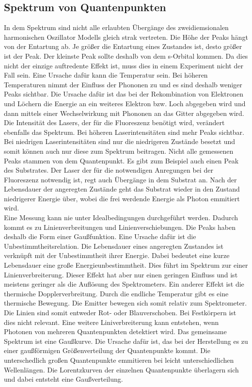 \subsection{Spektrum von Quantenpunkten}
In dem Spektrum sind nicht alle erlaubten Übergänge des zweidiemsionalen harmonischen Oszillator Modells gleich strak vertreten. Die Höhe der Peaks hängt von der Entartung ab. Je grö{\ss}er die Entartung eines Zustandes ist, desto grö{\ss}er ist der Peak. Der kleinste Peak sollte deshalb von dem s-Orbital kommen. Da dies nicht der einzige auftredente Effekt ist, muss dies in einem Experiment nicht der Fall sein. Eine Ursache dafür kann die Temperatur sein. Bei höheren Temperaturen nimmt der Einfluss der Phononen zu und es sind deshalb weniger Peaks sichtbar. 
Die Ursache dafür ist das bei der Rekombination von Elektronen und Löchern die Energie an ein weiteres Elektron bzw. Loch abgegeben wird und dann mittels einer Wechselwirkung mit Phononen an das Gitter abgegeben wird.
Die Intensität des Lasers, der für die Fluoreszenz benötigt wird, verändert ebenfalls das Spektrum. Bei höheren Laserintensitäten sind mehr Peaks sichtbar. 
Bei niedrigen Laserintensitäten sind nur die niedrigeren Zustände besetzt und somit können auch nur diese zum Spektrum beitragen.
Nicht alle gemessenen Peaks stammen von dem Quantenpunkt. Es gibt zum Beispiel auch einen Peak des Substrates.
Der Laser der für die notwendigen Anregungen bei der Fluoreszenz notwendig ist, regt auch Übergänge in dem Substrat an. Nach der Lebensdauer der angeregten Zustände geht das Substrat wieder in den Zustand niedrigerer Energie über, wobei die frei werdende Energie als Photon emmitiert wird. \\
Eine Messung kann nie unter Idealbedingungen durchgeführt werden. Dadurch kommt es zu Linienverbreitungen und Linienverschiebungen. Die Peaks haben deshalb die Form einer Gau{\ss}funktion. Eine Ursache dafür ist die Unbestimmtheitsrelation. Die Lebensdauer eines angeregten Zustandes ist verknüpft mit der Unbestimmtheit ihrer Energie.  Dabei bedeutet eine kurze Lebensdauer eine gro{\ss}e Energieunbestimmtheit. Dies führt im Spektrum zur einer Linienverbreiterung.
Dieser Effekt hat aber nur einen geringen Einfluss und ist meistens geringer als die Auflösung des Spektrometers. 
Ein anderer Effekt ist die thermische Dopplerverbreitung. Durch die endliche Temperatur gibt es eine thermische Bewegung. Die Emitter bewegen sich somit relativ zum Spektrometer. Die Linien sind somit entweder Rot- oder Blauverschoben.
Bei Festkörpern ist dies nicht relevant. 
Eine weitere Liniverbreiterung kann entstehen, wenn Photonen von mehreren Quantenpunkten detektiert wird. Das gemeinsame Spektrum ist eine Gaußkurve. Die Ursache dafür ist, das bei der Herstellung es zu einer gaußförmigen Größenverteilung der Quantenpunkte kommt. Die unterschedlich großen Quantenpunkte emmitieren bei leicht unterschiedlichen Wellenlängen. 
Die Lorentzkurven der einzelnen Quantenpunkte überlagern sich und dabei entsteht eine Gaußverteilung. 
